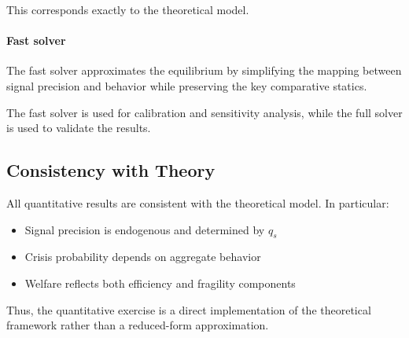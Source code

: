 This corresponds exactly to the theoretical model.

\paragraph{Fast solver}

The fast solver approximates the equilibrium by simplifying the mapping between signal precision and behavior while preserving the key comparative statics.

The fast solver is used for calibration and sensitivity analysis, while the full solver is used to validate the results.

\subsection{Consistency with Theory}

All quantitative results are consistent with the theoretical model. In particular:
\begin{itemize}
\item Signal precision is endogenous and determined by $q_s$
\item Crisis probability depends on aggregate behavior
\item Welfare reflects both efficiency and fragility components
\end{itemize}

Thus, the quantitative exercise is a direct implementation of the theoretical framework rather than a reduced-form approximation.
